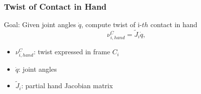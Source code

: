 \documentclass{beamer}
\begin{document}
\begin{frame}
\frametitle{Twist of Contact in Hand}
Goal: Given joint angles $\dot{q}$, compute twist of i-$th$ contact in hand 
\begin{equation*}
\nu_{i,hand}^C=\tilde{J}_i \dot{q},
\end{equation*}
\begin{itemize}
\item $\nu_{i,hand}^C$: twist expressed in frame {$C_i$} \vspace{.2cm}
\item $\dot{q}$: joint angles \vspace{.2cm}
\item $\tilde{J}_i$: partial hand Jacobian matrix \vspace{.2cm}
\end{itemize}
\end{frame}

\end{document}
